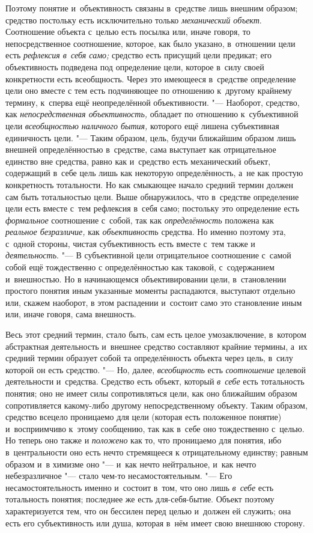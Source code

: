 Поэтому понятие и~объективность связаны в~средстве лишь
внешним образом; средство постольку есть исключительно только
{\em механический объект}.
Соотношение объекта с~целью есть посылка или, иначе говоря,
то непосредственное соотношение, которое, как было указано, в~отношении
цели есть {\em рефлексия в~себя само;}
средство есть присущий цели предикат; его объективность
подведена под определение цели, которое в~силу своей конкретности есть
всеобщность. Через это имеющееся в~средстве определение цели оно вместе с
тем есть подчиняющее по отношению к~другому крайнему термину, к~сперва ещё
неопределённой объективности. "--- Наоборот, средство, как
{\em непосредственная объективность,}
обладает по отношению к~субъективной цели
{\em всеобщностью наличного бытия,}
которого ещё лишена субъективная единичность цели. "---
Таким образом, цель, будучи ближайшим образом лишь внешней
определённостью в~средстве, сама выступает как отрицательное единство вне
средства, равно как и~средство есть механический объект, содержащий в~себе
цель лишь как некоторую определённость, а~не как простую конкретность
тотальности. Но как смыкающее начало средний термин должен сам быть
тотальностью цели. Выше обнаружилось, что в~средстве определение цели есть
вместе с~тем рефлексия в~себя само; постольку это определение есть
{\em формальное}
соотношение с~собой, так как
{\em определённость}
положена как {\em реальное
безразличие,} как
{\em объективность}
средства. Но именно поэтому эта, с~одной стороны, чистая
субъективность есть вместе с~тем также и
{\em деятельность}. "--- В
субъективной цели отрицательное соотношение с~самой собой ещё тождественно
с определённостью как таковой, с~содержанием и~внешностью. Но в
начинающемся объективировании цели, в~становлении простого понятия иным
указанные моменты распадаются, выступают отдельно или, скажем наоборот, в
этом распадении и~состоит само это становление иным или, иначе говоря, сама
внешность.

Весь этот средний термин, стало быть, сам есть целое
умозаключение, в~котором абстрактная деятельность и~внешнее средство
составляют крайние термины, а~их средний термин образует собой та
определённость объекта через цель, в~силу которой он есть средство. "---
Но, далее,
{\em всеобщность} есть
{\em соотношение} целевой
деятельности и~средства. Средство есть объект, который
{\em в~себе} есть
тотальность понятия; оно не имеет силы сопротивляться цели, как оно
ближайшим образом сопротивляется какому-либо другому непосредственному
объекту. Таким образом, средство всецело проницаемо для цели (которая есть
положенное понятие) и~восприимчиво к~этому сообщению, так как в~себе оно
тождественно с~целью. Но теперь оно также и
{\em положено} как то,
что проницаемо для понятия, ибо в~центральности оно есть нечто стремящееся
к отрицательному единству; равным образом и~в химизме оно
"--- и~как нечто нейтральное, и~как нечто небезразличное
"--- стало чем-то несамостоятельным. "--- Его
несамостоятельность именно и~состоит в~том, что оно лишь
{\em в~себе} есть
тотальность понятия; последнее же есть для-себя-бытие. Объект поэтому
характеризуется тем, что он бессилен перед целью и~должен ей служить; она
есть его субъективность или душа, которая в~нём имеет свою внешнюю сторону.

